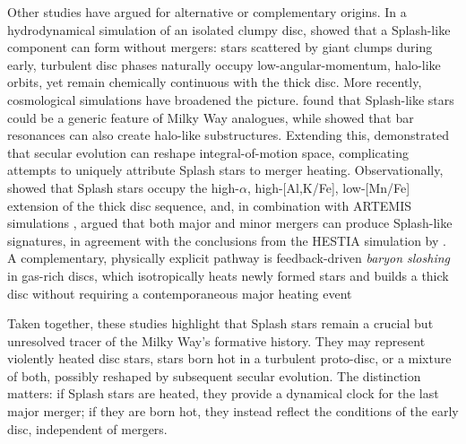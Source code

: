 \documentclass[fleqn,usenatbib]{mnras}
\begin{document}
Other studies have argued for alternative or complementary origins. In a hydrodynamical simulation of an isolated clumpy disc, \citet{Amarante2020} showed that a Splash-like component can form without mergers: stars scattered by giant clumps during early, turbulent disc phases naturally occupy low-angular-momentum, halo-like orbits, yet remain chemically continuous with the thick disc. More recently, cosmological simulations have broadened the picture. \citet{Dillamore2022} found that Splash-like stars could be a generic feature of Milky Way analogues, while \citet{Dillamore2023} showed that bar resonances can also create halo-like substructures. Extending this, \citet{Dillamore2025} demonstrated that secular evolution can reshape integral-of-motion space, complicating attempts to uniquely attribute Splash stars to merger heating. Observationally, \citet{Kisku2025} showed that Splash stars occupy the high-$\alpha$, high-[Al,K/Fe], low-[Mn/Fe] extension of the thick disc sequence, and, in combination with ARTEMIS simulations \citep{Font2020}, argued that both major and minor mergers can produce Splash-like signatures, in agreement with the conclusions from the HESTIA simulation by \citet{Khoperskov2023}. A complementary, physically explicit pathway is feedback-driven \textit{baryon sloshing} in gas-rich discs, which isotropically heats newly formed stars and builds a thick disc without requiring a contemporaneous major heating event \citep{BlandHawthorn2025}

Taken together, these studies highlight that Splash stars remain a crucial but unresolved tracer of the Milky Way’s formative history. They may represent violently heated disc stars, stars born hot in a turbulent proto-disc, or a mixture of both, possibly reshaped by subsequent secular evolution. The distinction matters: if Splash stars are heated, they provide a dynamical clock for the last major merger; if they are born hot, they instead reflect the conditions of the early disc, independent of mergers.
\end{document}
